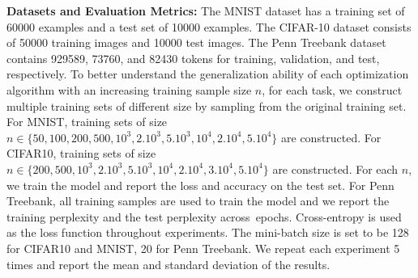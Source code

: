\documentclass[11pt]{article}
\begin{document}
\textbf{Datasets and Evaluation Metrics:}  The MNIST dataset has a training set of 60000 examples and a test set of 10000 examples. The CIFAR-10 dataset consists of 50000 
training images and 10000 test images. The Penn Treebank dataset contains 929589, 73760, and 82430 tokens for training, validation, and test,  respectively.
To better understand the generalization ability of each optimization algorithm with an increasing training sample size $n$, for each task, we construct multiple training sets of different size by sampling from the original training set. For MNIST, training sets of size $n \in \{50, 100, 200, 500, 10^3, 2.10^3, 5.10^3, 10^4, 2.10^4, 5.10^4 \}$ are constructed. For CIFAR10, training sets of size $n \in \{ 200, 500, 10^3, 2.10^3, 5.10^3, 10^4, 2.10^4,3.10^4, 5.10^4\}$ are constructed. 
For each $n$, we train the model and report the loss and accuracy on the test set.  
For Penn Treebank, all training samples are used to train the model and we report the training perplexity and the test perplexity across~epochs. 
Cross-entropy is used as the loss function throughout experiments. The mini-batch size is set to be 128 for CIFAR10 and MNIST, 20 for Penn Treebank. 
We repeat each experiment 5 times and report the mean and standard deviation of the results.
\end{document}
